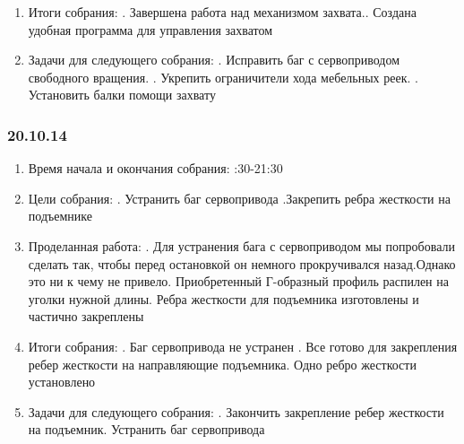 \documentclass[12pt]{article}
\begin{document}
\begin{enumerate}
	      	\item Итоги собрания:
	      	.	Завершена работа над механизмом захвата..	Создана удобная программа для управления захватом
	      	
	      	\item Задачи для следующего собрания:
	      	.	Исправить баг с сервоприводом свободного вращения.	.	Укрепить ограничители хода мебельных реек.	.	Установить балки помощи захвату
	      	
	      \end{enumerate}
	      \newpage
	      \subsubsection{20.10.14}
	      \begin{enumerate}
	      	\item Время начала и окончания собрания:
	      	:30-21:30
	      	\item Цели собрания:
	      	. Устранить баг сервопривода
	      	.Закрепить ребра жесткости на подъемнике
	      	\item Проделанная работа:
	      	. Для устранения бага с сервоприводом мы попробовали сделать так, чтобы перед остановкой он немного прокручивался назад.Однако это ни к чему не привело. Приобретенный Г-образный профиль распилен на уголки нужной длины.  Ребра жесткости для подъемника изготовлены и частично закреплены

	      	\item Итоги собрания:
	      	. Баг сервопривода не устранен
	      	. Все готово для закрепления ребер жесткости на направляющие подъемника. Одно ребро жесткости установлено
	      	\item Задачи для следующего собрания:
	      	. Закончить закрепление ребер жесткости на подъемник. Устранить баг сервопривода
	      \end{enumerate}
	      \newpage
\end{document}
